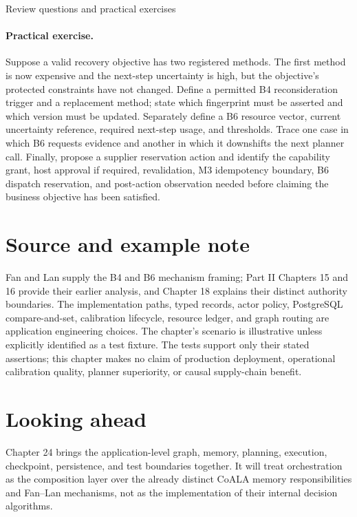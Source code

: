 \begin{reviewquestions}{Review questions and practical exercises}
\paragraph{Practical exercise.} Suppose a valid recovery objective has two registered methods. The first method is now expensive and the next-step uncertainty is high, but the objective's protected constraints have not changed. Define a permitted B4 reconsideration trigger and a replacement method; state which fingerprint must be asserted and which version must be updated. Separately define a B6 resource vector, current uncertainty reference, required next-step usage, and thresholds. Trace one case in which B6 requests evidence and another in which it downshifts the next planner call. Finally, propose a supplier reservation action and identify the capability grant, host approval if required, revalidation, M3 idempotency boundary, B6 dispatch reservation, and post-action observation needed before claiming the business objective has been satisfied.
\end{reviewquestions}

\section*{Source and example note}

Fan and Lan supply the B4 and B6 mechanism framing; Part II Chapters 15 and 16 provide their earlier analysis, and Chapter 18 explains their distinct authority boundaries. The implementation paths, typed records, actor policy, PostgreSQL compare-and-set, calibration lifecycle, resource ledger, and graph routing are application engineering choices. The chapter's scenario is illustrative unless explicitly identified as a test fixture. The tests support only their stated assertions; this chapter makes no claim of production deployment, operational calibration quality, planner superiority, or causal supply-chain benefit.


\section*{Looking ahead}

Chapter 24 brings the application-level graph, memory, planning, execution, checkpoint, persistence, and test boundaries together. It will treat orchestration as the composition layer over the already distinct CoALA memory responsibilities and Fan--Lan mechanisms, not as the implementation of their internal decision algorithms.
